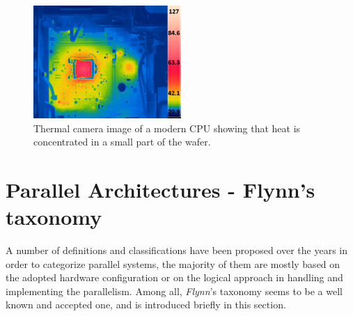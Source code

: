 \begin{figure}[!htbp]
	\centering
	\includegraphics[width=0.5\textwidth]{./images/parallel_programming/heat_cpu}
	\caption[CPU and Motherboard Temperature.]{Thermal camera image of a modern CPU showing that heat is concentrated in a small part of the wafer.}\label{fig:tempCPU_thermal}
\end{figure}

\section{Parallel Architectures - Flynn's taxonomy}
\label{sec:flynn_tax}
A number of definitions and classifications have been proposed  over the years in order to categorize parallel systems, the majority of them are mostly based on the adopted hardware configuration or on the logical approach in handling and implementing the parallelism. Among all, \textit{Flynn}'s  taxonomy \cite{flynn:1972,duncan:1990} seems to be a well known and accepted one, and is  introduced briefly in this section.

